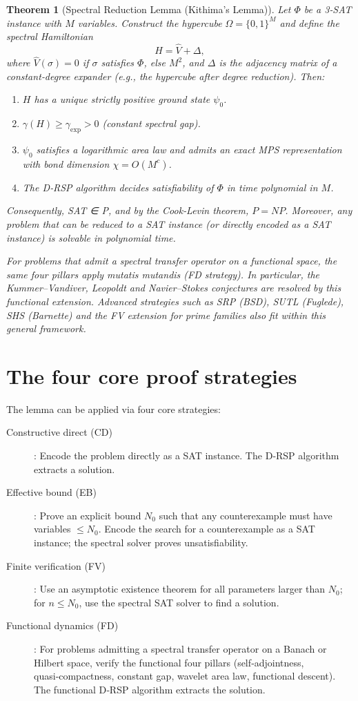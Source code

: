 \documentclass[11pt,a4paper]{article}
\newtheorem{theorem}{Theorem}[section]
\begin{document}
\begin{theorem}[Spectral Reduction Lemma (Kithima's Lemma)]
Let \(\Phi\) be a 3‑SAT instance with \(M\) variables. Construct the hypercube \(\Omega = \{0,1\}^M\) and define the spectral Hamiltonian
\[
H = \hat{V} + \Delta,
\]
where \(\hat{V}(\sigma)=0\) if \(\sigma\) satisfies \(\Phi\), else \(M^2\), and \(\Delta\) is the adjacency matrix of a constant‑degree expander (e.g., the hypercube after degree reduction). Then:
\begin{enumerate}
\item \(H\) has a unique strictly positive ground state \(\psi_0\).
\item \(\gamma(H) \ge \gamma_{\mathrm{exp}} > 0\) (constant spectral gap).
\item \(\psi_0\) satisfies a logarithmic area law and admits an exact MPS representation with bond dimension \(\chi = O(M^c)\).
\item The D‑RSP algorithm decides satisfiability of \(\Phi\) in time polynomial in \(M\).
\end{enumerate}
Consequently, SAT ∈ P, and by the Cook‑Levin theorem, \(P = NP\). Moreover, any problem that can be reduced to a SAT instance (or directly encoded as a SAT instance) is solvable in polynomial time.

For problems that admit a spectral transfer operator on a functional space, the same four pillars apply mutatis mutandis (FD strategy). In particular, the Kummer–Vandiver, Leopoldt and Navier–Stokes conjectures are resolved by this functional extension. Advanced strategies such as SRP (BSD), SUTL (Fuglede), SHS (Barnette) and the FV extension for prime families also fit within this general framework.
\end{theorem}

\section{The four core proof strategies}

The lemma can be applied via four core strategies:

\begin{description}
\item[Constructive direct (CD)]: Encode the problem directly as a SAT instance. The D‑RSP algorithm extracts a solution.
\item[Effective bound (EB)]: Prove an explicit bound \(N_0\) such that any counterexample must have variables \(\le N_0\). Encode the search for a counterexample as a SAT instance; the spectral solver proves unsatisfiability.
\item[Finite verification (FV)]: Use an asymptotic existence theorem for all parameters larger than \(N_0\); for \(n\le N_0\), use the spectral SAT solver to find a solution.
\item[Functional dynamics (FD)]: For problems admitting a spectral transfer operator on a Banach or Hilbert space, verify the functional four pillars (self‑adjointness, quasi‑compactness, constant gap, wavelet area law, functional descent). The functional D‑RSP algorithm extracts the solution.
\end{description}
\end{document}
